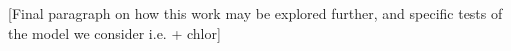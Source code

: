 [Final paragraph on how this work may be explored further, and specific tests of the model we consider i.e. + chlor]

%
%
%
%
%
%


%
%
%
%
%
%
%
%

